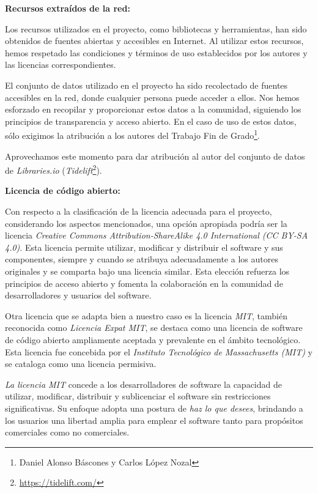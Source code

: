 \textbf{Recursos extraídos de la red:}

Los recursos utilizados en el proyecto, como bibliotecas y herramientas, han sido obtenidos 
de fuentes abiertas y accesibles en Internet. Al utilizar estos recursos, hemos respetado las condiciones y términos de 
uso establecidos por los autores y las licencias correspondientes.

El conjunto de datos utilizado en el proyecto ha sido recolectado de fuentes 
accesibles en la red, donde cualquier persona puede acceder a ellos. Nos hemos esforzado en recopilar y proporcionar estos 
datos a la comunidad, siguiendo los principios de transparencia y acceso abierto. En el caso de uso de estos datos, sólo 
exigimos la atribución a los autores del Trabajo Fin de Grado\footnote{Daniel Alonso Báscones y Carlos López Nozal}.

Aprovechamos este momento para dar atribución al autor del conjunto de datos de \textit{Libraries.io} (\textit{Tidelift}\footnote{\url{https://tidelift.com/}}).

\textbf{Licencia de código abierto:}

Con respecto a la clasificación de la licencia adecuada para el proyecto, considerando los aspectos mencionados, una opción 
apropiada podría ser la licencia \textit{Creative Commons Attribution-ShareAlike 4.0 International (CC BY-SA 4.0)}\cite{enwiki:1161291260}. Esta licencia 
permite utilizar, modificar y distribuir el software y sus componentes, siempre y cuando se atribuya adecuadamente a los 
autores originales y se comparta bajo una licencia similar. Esta elección refuerza los principios de acceso abierto y 
fomenta la colaboración en la comunidad de desarrolladores y usuarios del software.

Otra licencia que se adapta bien a nuestro caso es la licencia \textit{MIT}\cite{enwiki:1152945138}, también reconocida como 
\textit{Licencia Expat MIT}, se destaca como una licencia de software de código abierto ampliamente aceptada y 
prevalente en el ámbito tecnológico. Esta licencia fue concebida por el \textit{Instituto Tecnológico de Massachusetts
(MIT)} y se cataloga como una licencia permisiva.

\textit{La licencia MIT} concede a los desarrolladores de software la capacidad de utilizar, modificar, distribuir 
y sublicenciar el software sin restricciones significativas. Su enfoque adopta una postura de \textit{haz lo que desees}, 
brindando a los usuarios una libertad amplia para emplear el software tanto para propósitos comerciales como no comerciales.

